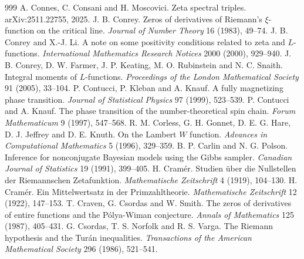 \begin{thebibliography}{999}
 A. Connes, C. Consani and H. Moscovici. Zeta spectral triples. arXiv:2511.22755, 2025.
 J. B. Conrey. Zeros of derivatives of Riemann's $\xi$-function on the critical line. \emph{Journal of Number Theory} 16 (1983), 49--74.
 J. B. Conrey and X.-J. Li. A note on some positivity conditions related to zeta and $L$-functions. \emph{International Mathematics Research Notices} 2000 (2000), 929--940.
 J. B. Conrey, D. W. Farmer, J. P. Keating, M. O. Rubinstein and N. C. Snaith. Integral moments of $L$-functions. \emph{Proceedings of the London Mathematical Society} 91 (2005), 33--104.
 P. Contucci, P. Kleban and A. Knauf. A fully magnetizing phase transition. \emph{Journal of Statistical Physics} 97 (1999), 523--539.
 P. Contucci and A. Knauf. The phase transition of the number-theoretical spin chain. \emph{Forum Mathematicum} 9 (1997), 547--568.
 R. M. Corless, G. H. Gonnet, D. E. G. Hare, D. J. Jeffrey and D. E. Knuth. On the Lambert $W$ function. \emph{Advances in Computational Mathematics} 5 (1996), 329--359.
 B. P. Carlin and N. G. Polson. Inference for nonconjugate Bayesian models using the Gibbs sampler. \emph{Canadian Journal of Statistics} 19 (1991), 399--405.
 H. Cram\'er. Studien \"uber die Nullstellen der Riemannschen Zetafunktion. \emph{Mathematische Zeitschrift} 4 (1919), 104--130.
 H. Cram\'er. Ein Mittelwertsatz in der Primzahltheorie. \emph{Mathematische Zeitschrift} 12 (1922), 147--153.
 T. Craven, G. Csordas and W. Smith. The zeros of derivatives of entire functions and the P\'olya-Wiman conjecture. \emph{Annals of Mathematics} 125 (1987), 405--431.
 G. Csordas, T. S. Norfolk and R. S. Varga. The Riemann hypothesis and the Tur\'an inequalities. \emph{Transactions of the American Mathematical Society} 296 (1986), 521--541.

\end{thebibliography}
